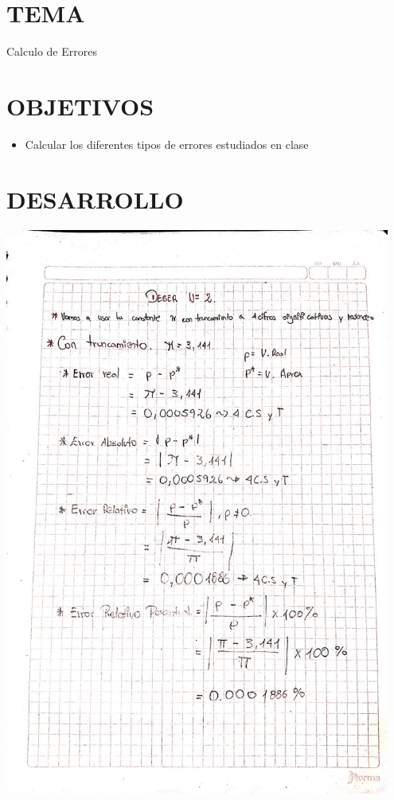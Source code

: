 \documentclass[12pt]{article}
\begin{document}
\section*{TEMA}
{Calculo de Errores}

\vspace{0.5cm}

\section*{OBJETIVOS}
\begin{itemize}
    \item { Calcular los diferentes tipos de errores estudiados en clase}
\end{itemize}

\vspace{0.5cm}

\section*{DESARROLLO}
\begin{minipage}{0.95\textwidth}
    \raggedleft
    \includegraphics[width=0.95\textwidth]{inFiles/Figures/img1.jpeg}
\end{minipage}
\end{document}
